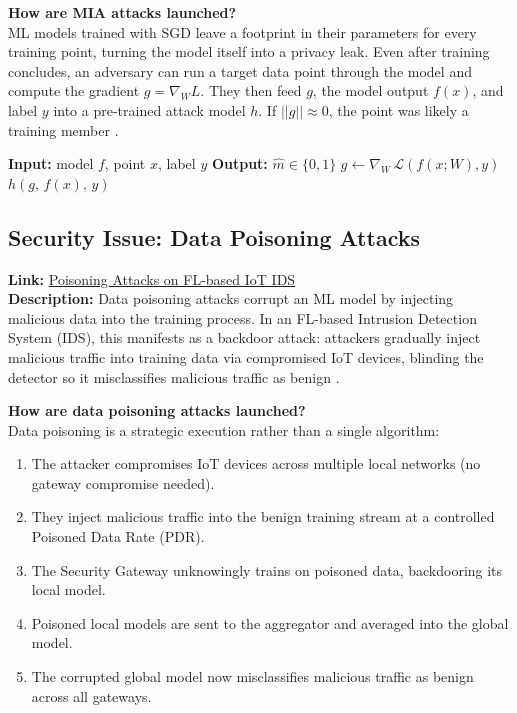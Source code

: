 \documentclass[letterpaper]{article}
\begin{document}
\textbf{How are MIA attacks launched?} \\
ML models trained with SGD leave a footprint in their parameters for every training point, turning the model itself into a privacy leak. Even after training concludes, an adversary can run a target data point through the model and compute the gradient $g=\nabla_{W}L$. They then feed $g$, the model output $f(x)$, and label $y$ into a pre-trained attack model $h$. If $||g||\approx0$, the point was likely a training member \cite{nasr2019}.

\begin{algorithm}[h!]
\caption{White-box Membership Inference Attack \cite{nasr2019}}
\begin{algorithmic}[1]
\State \textbf{Input:} model $f$, point $x$, label $y$
\State \textbf{Output:} $\hat{m} \in \{0,1\}$ 
\State $g \leftarrow \nabla_{W}\,\mathcal{L}(f(x;W), y)$ 
\State \Return $h(g,\, f(x),\, y)$ 
\end{algorithmic}
\end{algorithm}


\pagebreak

\subsection*{Security Issue: Data Poisoning Attacks}
\textbf{Link:} \href{https://www.ndss-symposium.org/wp-content/uploads/2020/04/diss2020-23003-paper.pdf}{Poisoning Attacks on FL-based IoT IDS \cite{nguyen2020}} \\
\textbf{Description:} Data poisoning attacks corrupt an ML model by injecting malicious data into the training process. In an FL-based Intrusion Detection System (IDS), this manifests as a backdoor attack: attackers gradually inject malicious traffic into training data via compromised IoT devices, blinding the detector so it misclassifies malicious traffic as benign \cite{nguyen2020}.

\textbf{How are data poisoning attacks launched?} \\
Data poisoning is a strategic execution rather than a single algorithm:
\begin{enumerate}
    \item The attacker compromises IoT devices across multiple local networks (no gateway compromise needed).
    \item They inject malicious traffic into the benign training stream at a controlled Poisoned Data Rate (PDR).
    \item The Security Gateway unknowingly trains on poisoned data, backdooring its local model.
    \item Poisoned local models are sent to the aggregator and averaged into the global model.
    \item The corrupted global model now misclassifies malicious traffic as benign across all gateways.
\end{enumerate}
\end{document}
